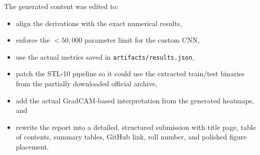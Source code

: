 \documentclass[11pt]{article}
\begin{document}
The generated content was edited to:
\begin{itemize}
  \item align the derivations with the exact numerical results,
  \item enforce the \(<50{,}000\) parameter limit for the custom CNN,
  \item use the actual metrics saved in \texttt{artifacts/results.json},
  \item patch the STL-10 pipeline so it could use the extracted train/test binaries from the partially downloaded official archive,
  \item add the actual GradCAM-based interpretation from the generated heatmaps, and
  \item rewrite the report into a detailed, structured submission with title page, table of contents, summary tables, GitHub link, roll number, and polished figure placement.
\end{itemize}
\end{document}
